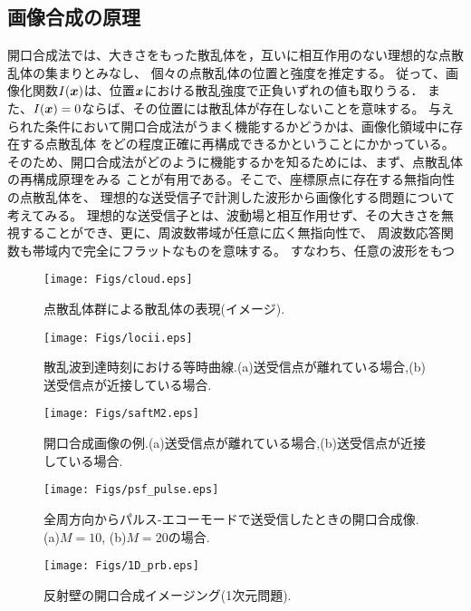 \documentclass[10pt,a4j,dvipdfmx]{jarticle}
\begin{document}
\subsection{画像合成の原理}
開口合成法では、大きさをもった散乱体を，互いに相互作用のない理想的な点散乱体の集まりとみなし、
個々の点散乱体の位置と強度を推定する。
従って、画像化関数$I(\mbox{\boldmath $x$})$は、位置$\mbox{\boldmath $x$}$における散乱強度で正負いずれの値も取りうる．
また、$I(\mbox{\boldmath $x$})=0$ならば、その位置には散乱体が存在しないことを意味する。
与えられた条件において開口合成法がうまく機能するかどうかは、画像化領域中に存在する点散乱体
をどの程度正確に再構成できるかということにかかっている。
そのため、開口合成法がどのように機能するかを知るためには、まず、点散乱体の再構成原理をみる
ことが有用である。そこで、座標原点に存在する無指向性の点散乱体を、
理想的な送受信子で計測した波形から画像化する問題について考えてみる。
理想的な送受信子とは、波動場と相互作用せず、その大きさを無視することができ、更に、周波数帯域が任意に広く無指向性で、
周波数応答関数も帯域内で完全にフラットなものを意味する。
すなわち、任意の波形をもつ
\begin{figure}[h]
	\begin{center}
	\texttt{[image: Figs/cloud.eps]} 
	\end{center}
	\caption{点散乱体群による散乱体の表現(イメージ).} 
	\label{fig:cloud}
\end{figure}
\begin{figure}[h]
	\begin{center}
	\texttt{[image: Figs/locii.eps]} 
	\end{center}
	\caption{散乱波到達時刻における等時曲線.(a)送受信点が離れている場合,(b)送受信点が近接している場合.} 
	\label{fig:locii}
\end{figure}
\begin{figure}[h]
	\begin{center}
	\texttt{[image: Figs/saftM2.eps]} 
	\end{center}
	\caption{開口合成画像の例.(a)送受信点が離れている場合,(b)送受信点が近接している場合.} 
	\label{fig:saftM2}
\end{figure}
\begin{figure}[h]
	\begin{center}
	\texttt{[image: Figs/psf\_pulse.eps]} 
	\end{center}
	\caption{全周方向からパルス-エコーモードで送受信したときの開口合成像.(a)$M=10$, (b)$M=20$の場合.} 
	\label{fig:psf_pulse}
\end{figure}
\begin{figure}[h]
	\begin{center}
	\texttt{[image: Figs/1D\_prb.eps]} 
	\end{center}
	\caption{反射壁の開口合成イメージング(1次元問題).} 
	\label{fig:1D_prb}
\end{figure}
\end{document}
